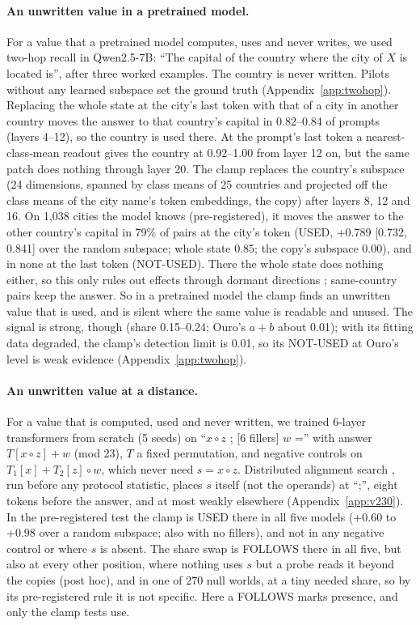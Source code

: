 \documentclass{article}
\begin{document}
\paragraph{An unwritten value in a pretrained model.} For a value that a pretrained model computes, uses and never writes, we used two-hop recall in Qwen2.5-7B: ``The capital of the country where the city of $X$ is located is'', after three worked examples. The country is never written. Pilots without any learned subspace set the ground truth (Appendix~\ref{app:twohop}). Replacing the whole state at the city's last token with that of a city in another country moves the answer to that country's capital in 0.82--0.84 of prompts (layers 4--12), so the country is used there. At the prompt's last token a nearest-class-mean readout gives the country at 0.92--1.00 from layer 12 on, but the same patch does nothing through layer 20. The clamp replaces the country's subspace (24 dimensions, spanned by class means of 25 countries and projected off the class means of the city name's token embeddings, the copy) after layers 8, 12 and 16. On 1,038 cities the model knows (pre-registered), it moves the answer to the other country's capital in 79\% of pairs at the city's token (USED, +0.789 [0.732, 0.841] over the random subspace; whole state 0.85; the copy's subspace 0.00), and in none at the last token (NOT-USED). There the whole state does nothing either, so this only rules out effects through dormant directions \citep{makelov2023}; same-country pairs keep the answer. So in a pretrained model the clamp finds an unwritten value that is used, and is silent where the same value is readable and unused. The signal is strong, though (share 0.15--0.24; Ouro's $a+b$ about 0.01); with its fitting data degraded, the clamp's detection limit is 0.01, so its NOT-USED at Ouro's level is weak evidence (Appendix~\ref{app:twohop}).

\paragraph{An unwritten value at a distance.} For a value that is computed, used and never written, we trained 6-layer transformers from scratch (5 seeds) on ``$x \circ z$ ; [6 fillers] $w$ ='' with answer $T[x \circ z] + w$ (mod 23), $T$ a fixed permutation, and negative controls on $T_1[x] + T_2[z] \circ w$, which never need $s = x \circ z$. Distributed alignment search \citep{geiger2024finding}, run before any protocol statistic, places $s$ itself (not the operands) at ``;'', eight tokens before the answer, and at most weakly elsewhere (Appendix~\ref{app:v230}). In the pre-registered test the clamp is USED there in all five models (+0.60 to +0.98 over a random subspace; also with no fillers), and not in any negative control or where $s$ is absent. The share swap is FOLLOWS there in all five, but also at every other position, where nothing uses $s$ but a probe reads it beyond the copies (post hoc), and in one of 270 null worlds, at a tiny needed share, so by its pre-registered rule it is not specific. Here a FOLLOWS marks presence, and only the clamp tests use.
\end{document}
